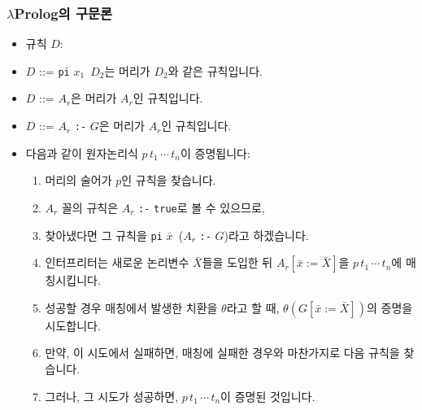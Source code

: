 \documentclass[slidestop,compress,mathserif]{beamer}
\begin{document}
    \begin{frame}
        \frametitle{$\lambda$Prolog의 구문론}
        \begin{itemize}
            \item 규칙 $D$:
            \item $D$ ::= \texttt{pi} $x_1$\texttt{\string\ }$D_2$는 머리가 $D_2$와 같은 규칙입니다.
            \item $D$ ::= $A_r$은 머리가 $A_r$인 규칙입니다.
            \item $D$ ::= $A_r$ \texttt{:-} $G$은 머리가 $A_r$인 규칙입니다.
            \item 다음과 같이 원자논리식 $p \, t_1 \, \cdots \, t_n$이 증명됩니다:
            \begin{enumerate}
                \item 머리의 술어가 $p$인 규칙을 찾습니다.
                \item $A_r$ 꼴의 규칙은 $A_r$ \texttt{:-} \texttt{true}로 볼 수 있으므로,
                \item 찾아냈다면 그 규칙을 \texttt{pi} $\bar{x}$\texttt{\string\ }($A_r$ \texttt{:-} $G$)라고 하겠습니다.
                \item 인터프리터는 새로운 논리변수 $\bar{X}$들을 도입한 뒤 $A_r \left[ \bar{x} := \bar{X} \right]$을 $p \, t_1 \, \cdots \, t_n$에 매칭시킵니다.
                \item 성공할 경우 매칭에서 발생한 치환을 $\theta$라고 할 때, $\theta \left( G \left[ \bar{x} := \bar{X} \right] \right)$의 증명을 시도합니다.
                \item 만약, 이 시도에서 실패하면, 매칭에 실패한 경우와 마찬가지로 다음 규칙을 찾습니다.
                \item 그러나, 그 시도가 성공하면, $p \, t_1 \, \cdots \, t_n$이 증명된 것입니다.
            \end{enumerate}
        \end{itemize}
    \end{frame}
\end{document}
